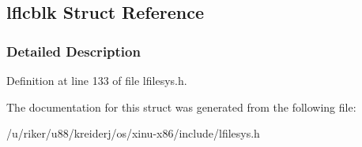 \hypertarget{structlflcblk}{}\subsection{lflcblk Struct Reference}
\label{structlflcblk}


\subsubsection{Detailed Description}


Definition at line 133 of file lfilesys.\+h.



The documentation for this struct was generated from the following file\+:\begin{DoxyCompactItemize}
\item 
/u/riker/u88/kreiderj/os/xinu-\/x86/include/lfilesys.\+h\end{DoxyCompactItemize}
